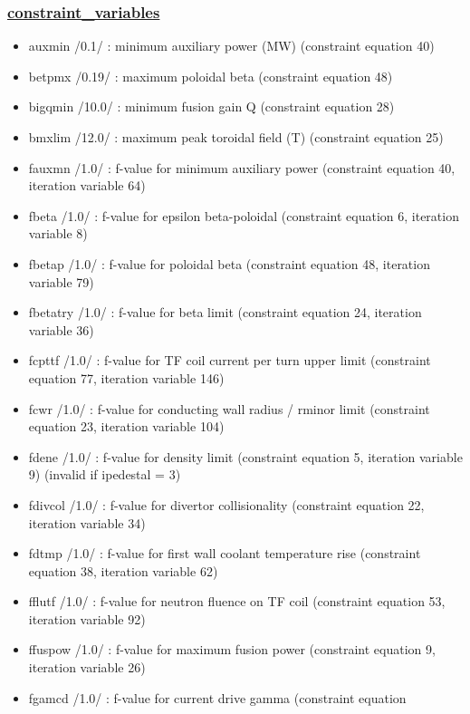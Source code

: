 \documentclass[]{article}
\providecommand{\tightlist}{%
  \setlength{\itemsep}{0pt}\setlength{\parskip}{0pt}}
\begin{document}
\subsubsection{\texorpdfstring{\href{constraint_variables.html}{constraint\_variables}}{constraint\_variables}}\label{constraint_variables}

\begin{itemize}
\tightlist
\item
  auxmin /0.1/ : minimum auxiliary power (MW) (constraint equation 40)
\item
  betpmx /0.19/ : maximum poloidal beta (constraint equation 48)
\item
  bigqmin /10.0/ : minimum fusion gain Q (constraint equation 28)
\item
  bmxlim /12.0/ : maximum peak toroidal field (T) (constraint equation
  25)
\item
  fauxmn /1.0/ : f-value for minimum auxiliary power (constraint
  equation 40, iteration variable 64)
\item
  fbeta /1.0/ : f-value for epsilon beta-poloidal (constraint equation
  6, iteration variable 8)
\item
  fbetap /1.0/ : f-value for poloidal beta (constraint equation 48,
  iteration variable 79)
\item
  fbetatry /1.0/ : f-value for beta limit (constraint equation 24,
  iteration variable 36)
\item
  fcpttf /1.0/ : f-value for TF coil current per turn upper limit
  (constraint equation 77, iteration variable 146)
\item
  fcwr /1.0/ : f-value for conducting wall radius / rminor limit
  (constraint equation 23, iteration variable 104)
\item
  fdene /1.0/ : f-value for density limit (constraint equation 5,
  iteration variable 9) (invalid if ipedestal = 3)
\item
  fdivcol /1.0/ : f-value for divertor collisionality (constraint
  equation 22, iteration variable 34)
\item
  fdtmp /1.0/ : f-value for first wall coolant temperature rise
  (constraint equation 38, iteration variable 62)
\item
  fflutf /1.0/ : f-value for neutron fluence on TF coil (constraint
  equation 53, iteration variable 92)
\item
  ffuspow /1.0/ : f-value for maximum fusion power (constraint equation
  9, iteration variable 26)
\item
  fgamcd /1.0/ : f-value for current drive gamma (constraint equation

\end{itemize}
\end{document}

